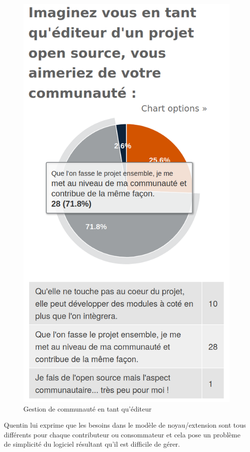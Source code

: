 			\begin{figure}[!htb]
				\center
				\includegraphics[scale=0.28]{./img/communaute}
				\caption{Gestion de communauté en tant qu'éditeur}
			\end{figure}

			Quentin  lui exprime que les besoins dans le modèle de noyau/extension sont tous différents pour chaque contributeur ou consommateur et cela pose un problème de simplicité du logiciel résultant qu'il est difficile de gérer.

